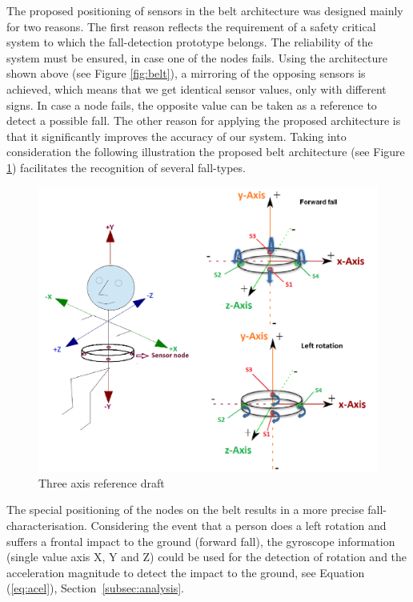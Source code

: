 \documentclass[review]{elsarticle}
\begin{document}
The proposed positioning of sensors in the belt architecture was designed mainly for two reasons. The first reason 
reflects the requirement of a safety critical system to which the fall-detection prototype belongs. The reliability 
of the system must be ensured, in case one of the nodes fails. Using the architecture shown above (see Figure \ref{fig:belt}), 
a mirroring of the opposing sensors is achieved, which means that we get identical sensor values, only with different signs. 
In case a node fails, the opposite value can be taken as a reference to detect a possible fall. The other reason for 
applying the proposed architecture is that it significantly improves the accuracy of our system. Taking into 
consideration the following illustration the proposed belt architecture
(see Figure \ref{fig:axisreference}) facilitates the recognition of several fall-types.

\begin{figure}[!ht]
  \centering
  \includegraphics[scale=0.2]{./img/axis}
  \caption[Three axis reference draft]{Three axis reference draft \cite{LaBlunda.2016b,LuigiMasterThesis}}
  \label{fig:axisreference}
\end{figure}

The special positioning of the nodes on the belt results in a more precise fall-characterisation. Considering 
the event that a person does a left rotation and suffers a frontal impact to the ground (forward fall), 
the gyroscope information (single value axis X, Y and Z) could be used for the detection of rotation and the 
acceleration magnitude to detect the impact to the ground, see Equation (\ref{eq:acel}), Section~\ref{subsec:analysis}.
\end{document}
